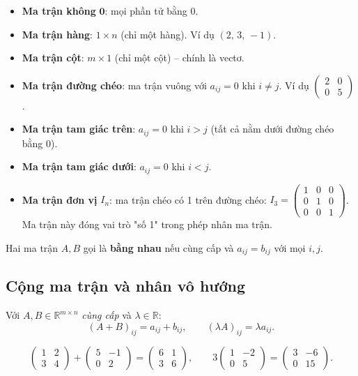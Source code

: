 \documentclass[12pt,a4paper]{article}
\begin{document}
\begin{vidu}[title={Các kiểu ma trận đặc biệt}]
\begin{itemize}
  \item \textbf{Ma trận không} $\mathbf{0}$: mọi phần tử bằng 0.
  \item \textbf{Ma trận hàng}: $1 \times n$ (chỉ một hàng). Ví dụ $(2,\,3,\,-1)$.
  \item \textbf{Ma trận cột}: $m \times 1$ (chỉ một cột) -- chính là vectơ.
  \item \textbf{Ma trận đường chéo}: ma trận vuông với $a_{ij}=0$ khi $i \ne j$. Ví dụ $\begin{pmatrix}2&0\\0&5\end{pmatrix}$.
  \item \textbf{Ma trận tam giác trên}: $a_{ij} = 0$ khi $i > j$ (tất cả nằm dưới đường chéo bằng 0).
  \item \textbf{Ma trận tam giác dưới}: $a_{ij} = 0$ khi $i < j$.
  \item \textbf{Ma trận đơn vị} $I_n$: ma trận chéo có 1 trên đường chéo: $I_3 = \begin{pmatrix}1&0&0\\0&1&0\\0&0&1\end{pmatrix}$. Ma trận này đóng vai trò "số 1" trong phép nhân ma trận.
\end{itemize}
\end{vidu}

\begin{dinhnghia}
  Hai ma trận $A, B$ gọi là \textbf{bằng nhau} nếu cùng cấp và $a_{ij} = b_{ij}$ với mọi $i, j$.
\end{dinhnghia}

\subsection{Cộng ma trận và nhân vô hướng}

\begin{dinhnghia}
  Với $A, B \in \mathbb{R}^{m \times n}$ \emph{cùng cấp} và $\lambda \in \mathbb{R}$:
  \[
    (A + B)_{ij} = a_{ij} + b_{ij},\qquad (\lambda A)_{ij} = \lambda a_{ij}.
  \]
\end{dinhnghia}

\begin{vidu}
\[
  \begin{pmatrix}1&2\\3&4\end{pmatrix} + \begin{pmatrix}5&-1\\0&2\end{pmatrix} = \begin{pmatrix}6&1\\3&6\end{pmatrix},\qquad
  3 \begin{pmatrix}1&-2\\0&5\end{pmatrix} = \begin{pmatrix}3&-6\\0&15\end{pmatrix}.
\]
\end{vidu}
\end{document}

